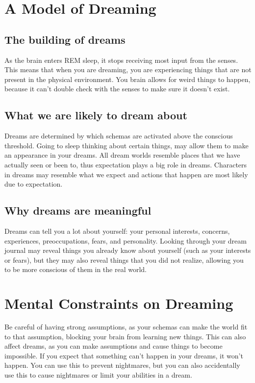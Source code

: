 \documentclass{report}
\begin{document}
\section{A Model of Dreaming}
\subsection{The building of dreams}
As the brain enters REM sleep, it stops receiving most input from the senses. This means that when you are dreaming, you are experiencing things that are not present in the physical environment. You brain allows for weird things to happen, because it can't double check with the senses to make sure it doesn't exist. 

\subsection{What we are likely to dream about}
Dreams are determined by which schemas are activated above the conscious threshold. Going to sleep thinking about certain things, may allow them to make an appearance in your dreams. All dream worlds resemble places that we have actually seen or been to, thus expectation plays a big role in dreams. Characters in dreams may resemble what we expect and actions that happen are most likely due to expectation. 

\subsection{Why dreams are meaningful}
Dreams can tell you a lot about yourself: your personal interests, concerns, experiences, preoccupations, fears, and personality. Looking through your dream journal may reveal things you already know about yourself (such as your interests or fears), but they may also reveal things that you did not realize, allowing you to be more conscious of them in the real world.

\section{Mental Constraints on Dreaming} 
Be careful of having strong assumptions, as your schemas can make the world fit to that assumption, blocking your brain from learning new things. This can also affect dreams, as you can make assumptions and cause things to become impossible. If you expect that something can't happen in your dreams, it won't happen. You can use this to prevent nightmares, but you can also accidentally use this to cause nightmares or limit your abilities in a dream.
\end{document}
